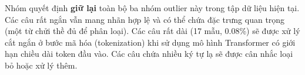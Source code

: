 Nhóm quyết định \textbf{giữ lại} toàn bộ ba nhóm outlier này trong tập dữ liệu hiện tại. Các câu rất ngắn vẫn mang nhãn hợp lệ và có thể chứa đặc trưng quan trọng (một từ chửi thề đủ để phân loại). Các câu rất dài (17 mẫu, 0.08\%) sẽ được xử lý cắt ngắn ở bước mã hóa (tokenization) khi sử dụng mô hình Transformer có giới hạn chiều dài token đầu vào. Các câu chứa nhiều ký tự lạ sẽ được cân nhắc loại bỏ hoặc xử lý thêm.